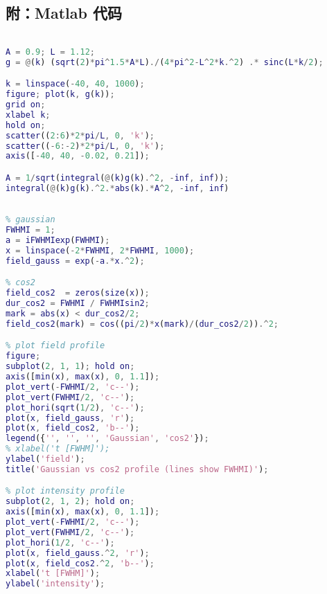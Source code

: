 \subsection{附：Matlab 代码}
\begin{lstlisting}[language=matlab, caption=cos2\_spec.m]
% properties of cos2 wave packet spectra

A = 0.9; L = 1.12;
g = @(k) (sqrt(2)*pi^1.5*A*L)./(4*pi^2-L^2*k.^2) .* sinc(L*k/2);

k = linspace(-40, 40, 1000);
figure; plot(k, g(k));
grid on;
xlabel k;
hold on;
scatter((2:6)*2*pi/L, 0, 'k');
scatter((-6:-2)*2*pi/L, 0, 'k');
axis([-40, 40, -0.02, 0.21]);

A = 1/sqrt(integral(@(k)g(k).^2, -inf, inf));
integral(@(k)g(k).^2.*abs(k).*A^2, -inf, inf)

\end{lstlisting}

\begin{lstlisting}[language=matlab, caption=sin2\_gaussian\_compare.m]
% plot Gaussian vs cos2 profile

% gaussian
FWHMI = 1;
a = iFWHMIexp(FWHMI);
x = linspace(-2*FWHMI, 2*FWHMI, 1000);
field_gauss = exp(-a.*x.^2);

% cos2
field_cos2  = zeros(size(x));
dur_cos2 = FWHMI / FWHMIsin2;
mark = abs(x) < dur_cos2/2;
field_cos2(mark) = cos((pi/2)*x(mark)/(dur_cos2/2)).^2;

% plot field profile
figure;
subplot(2, 1, 1); hold on;
axis([min(x), max(x), 0, 1.1]);
plot_vert(-FWHMI/2, 'c--');
plot_vert(FWHMI/2, 'c--');
plot_hori(sqrt(1/2), 'c--');
plot(x, field_gauss, 'r');
plot(x, field_cos2, 'b--');
legend({'', '', '', 'Gaussian', 'cos2'});
% xlabel('t [FWHM]');
ylabel('field');
title('Gaussian vs cos2 profile (lines show FWHMI)');

% plot intensity profile
subplot(2, 1, 2); hold on;
axis([min(x), max(x), 0, 1.1]);
plot_vert(-FWHMI/2, 'c--');
plot_vert(FWHMI/2, 'c--');
plot_hori(1/2, 'c--');
plot(x, field_gauss.^2, 'r');
plot(x, field_cos2.^2, 'b--');
xlabel('t [FWHM]');
ylabel('intensity');
\end{lstlisting}
